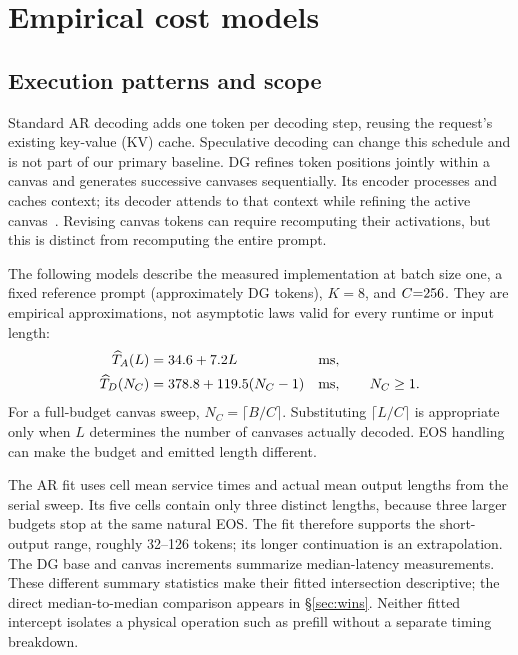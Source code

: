 \section{Empirical cost models}
\label{sec:laws}

\subsection{Execution patterns and scope}
Standard AR decoding adds one token per decoding step, reusing the
request's existing key-value (KV) cache. Speculative decoding can change
this schedule and is not part of our primary baseline. DG refines token
positions jointly within a canvas and generates successive canvases
sequentially. Its encoder processes and caches context; its decoder
attends to that context while refining the active canvas~\cite{diffusiongemma}.
Revising canvas tokens can require recomputing their activations, but this
is distinct from recomputing the entire prompt.

The following models describe the measured implementation at batch size
one, a fixed reference prompt (approximately  DG tokens),
$K{=}8$, and $C{=}256$. They are empirical approximations,
not asymptotic laws valid for every runtime or input length:
\begin{align}
\label{eq:ar}
\widehat T_A(L) &= 34.6 + 7.2 L && \text{ms},\\
\label{eq:dg}
\widehat T_D(N_C) &= 378.8 + 119.5(N_C-1) && \text{ms},\qquad N_C\geq1.
\end{align}
For a full-budget canvas sweep, $N_C=\lceil B/C\rceil$. Substituting
$\lceil L/C\rceil$ is appropriate only when $L$ determines the number
of canvases actually decoded. EOS handling can make the budget and
emitted length different.

The AR fit uses cell mean service times and actual mean output lengths
from the serial sweep. Its five cells contain only three distinct
lengths, because three larger budgets stop at the same natural EOS.
The fit therefore supports the short-output range, roughly 32--126 tokens;
its longer continuation is an extrapolation. The DG base and canvas
increments summarize median-latency measurements. These different summary
statistics make their fitted intersection descriptive; the direct
median-to-median comparison appears in \S\ref{sec:wins}.
Neither fitted intercept isolates a physical operation such as prefill
without a separate timing breakdown.


